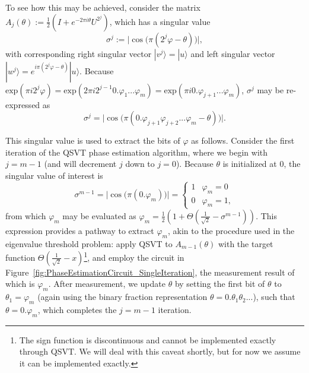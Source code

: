 \documentclass[aps,pra,showpacs,notitlepage,twocolumn,superscriptaddress,nofootinbib]{revtex4-1}
\begin{document}
    To see how this may be achieved, consider the matrix $A_j(\theta) := \frac{1}{2} (I+e^{-2\pi i \theta} U^{2^j})$, which has a singular value 
        \begin{equation}\label{eq:singular_value_expression}
            \sigma^j := \big|\cos\big(\pi (2^j \varphi - \theta)\big) \big|,
        \end{equation}
    with corresponding right singular vector $|v^j\rangle = |u\rangle$ and left singular vector $|w^j\rangle = e^{i\pi(2^j \varphi-\theta)}|u\rangle$. Because $\text{exp}({\pi i 2^j \varphi}) = \text{exp}(2\pi i 2^{j-1} 0.\varphi_1 ... \varphi_m) = \text{exp}(\pi i 0.\varphi_{j+1}  ... \varphi_m) $, $\sigma^j$ may be re-expressed as 
        \begin{equation}\label{eq:singular_value_reexpression}
            \sigma^j = \big|\cos\big(\pi (0.\varphi_{j+1} \varphi_{j+2}...\varphi_m - \theta)\big) \big|.
        \end{equation}
        
    This singular value is used to extract the bits of $\varphi$ as follows. Consider the first iteration of the QSVT phase estimation algorithm, where we begin with $j=m-1$ (and will decrement $j$ down to $j=0$). Because $\theta$ is initialized at $0$, the singular value of interest is 
    \begin{equation} \label{eq:s_m}
        \sigma^{m-1} = \big|\cos\big(\pi (0.\varphi_{m})\big) \big| = 
        \begin{cases}
            1 & \varphi_m=0 \\
            0 & \varphi_m=1,
        \end{cases}
    \end{equation}
    from which $\varphi_m$ may be evaluated as $\varphi_m = \frac{1}{2}\left( 1 + \Theta\left(\frac{1}{\sqrt{2}} - \sigma^{m-1} \right) \right)$. This expression provides a pathway to extract $\varphi_m$, akin to the procedure used in the eigenvalue threshold problem: apply QSVT to $A_{m-1}(\theta)$ with the target function $\Theta\left(\frac{1}{\sqrt{2}}  -x \right)$\footnote{The sign function is discontinuous and cannot be implemented exactly through QSVT. We will deal with this caveat shortly, but for now we assume it can be implemented exactly.}, and employ the circuit in Figure~\ref{fig:PhaseEstimationCircuit_SingleIteration}, the measurement result of which is $\varphi_m$. After measurement, we update $\theta$ by setting the first bit of $\theta$ to $\theta_1 = \varphi_m$ (again using the binary fraction representation $\theta = 0.\theta_1\theta_2...$), such that $\theta = 0.\varphi_m$, which completes the $j=m-1$ iteration. 
    
\end{document}
